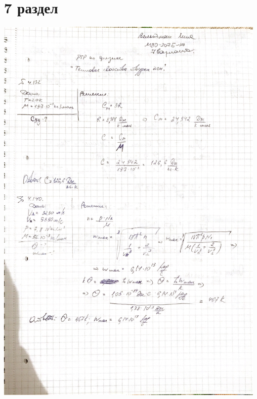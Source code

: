 \documentclass[12pt]{article}
\begin{document}
\section{7 раздел}
\begin{center}
\includegraphics[scale=0.2]{7_1.jpeg}\\
\vfill

\end{center}
\end{document}
